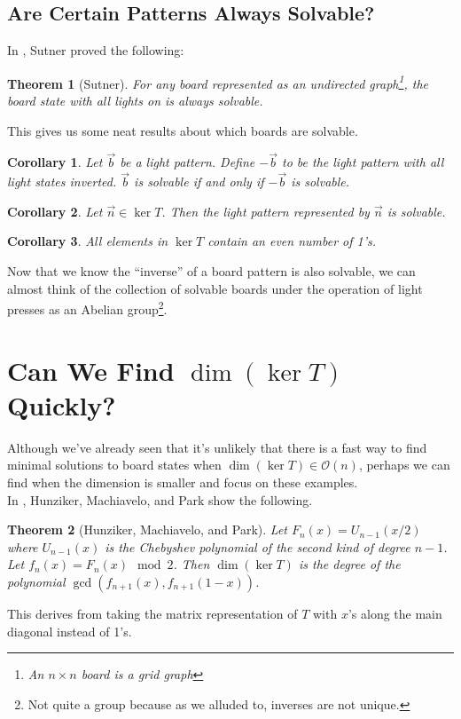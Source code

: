 \documentclass[a4paper]{article}
\renewcommand{\O}{\mathcal{O}}
\newtheorem*{theorem}{Theorem}
\newtheorem*{corollary}{Corollary}
\begin{document}
	\subsection{Are Certain Patterns Always Solvable?}
	In \cite{Sutner1989}, Sutner proved the following:
	\begin{theorem}[Sutner]
		For any board represented as an undirected graph\footnote{An  $n \times n$ board is a grid graph}, the board state with all lights on is always solvable.
	\end{theorem}
	This gives us some neat results about which boards are solvable.
	
	\begin{corollary}
		Let $\vec{b}$ be a light pattern.
		Define $-\vec{b}$ to be the light pattern with all light states inverted.
		$\vec{b}$ is solvable if and only if $-\vec{b}$ is solvable.
	\end{corollary}
	\begin{corollary}
		Let $\vec{n} \in \ker{T}$.
		Then the light pattern represented by $\vec{n}$ is solvable.
	\end{corollary}
	\begin{corollary}
		All elements in $\ker{T}$ contain an even number of 1's.
	\end{corollary}

	Now that we know the ``inverse'' of a board pattern is also solvable, we can almost think of the collection of solvable boards under the operation of light presses as an Abelian group\footnote{Not quite a group because as we alluded to, inverses are not unique.}.

	\section{Can We Find $\dim{(\ker{T})}$ Quickly?}
	Although we've already seen that it's unlikely that there is a fast way to find minimal solutions to board states when $\dim{(\ker T)} \in \O(n)$, perhaps we can find when the dimension is smaller and focus on these examples. \\
	
	In \cite{HUNZIKER2004465}, Hunziker, Machiavelo, and Park show the following.
	\begin{theorem}[Hunziker, Machiavelo, and Park]
		Let $F_n(x) = U_{n-1}(x/2)$ where $U_{n-1}(x)$ is the Chebyshev polynomial of the second kind of degree $n-1$.
		Let $f_n(x) = F_n(x) \mod 2$.
		Then $\dim{(\ker T)}$ is the degree of the polynomial $\gcd{(f_{n+1}(x),f_{n+1}(1-x))}$.
	\end{theorem}
	This derives from taking the matrix representation of $T$ with $x$'s along the main diagonal instead of 1's.
	
\end{document}

